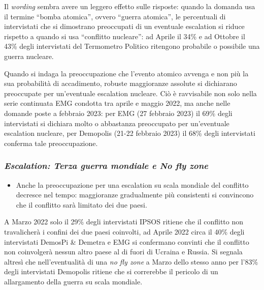 \documentclass[
  openany]{book}
\providecommand{\tightlist}{%
  \setlength{\itemsep}{0pt}\setlength{\parskip}{0pt}}
\begin{document}
Il \emph{wording} sembra avere un leggero effetto sulle risposte: quando la domanda usa il termine ``bomba atomica'', ovvero ``guerra atomica'', le percentuali di intervistati che si dimostrano preoccupati di un eventuale escalation si riduce rispetto a quando si usa ``conflitto nucleare'': ad Aprile il 34\% e ad Ottobre il 43\% degli intervistati del Termometro Politico ritengono probabile o possibile una guerra nucleare.

Quando si indaga la preoccupazione che l'evento atomico avvenga e non più la sua probabilità di accadimento, robuste maggioranze assolute si dichiarano preoccupate per un'eventuale escalation nucleare. Ciò è ravvisabile non solo nella serie continuata EMG condotta tra aprile e maggio 2022, ma anche nelle domande poste a febbraio 2023: per EMG (27 febbraio 2023) il 69\% degli intervistati si dichiara molto o abbastanza preoccupato per un'eventuale escalation nucleare, per Demopolis (21-22 febbraio 2023) il 68\% degli intervistati conferma tale preoccupazione.

\hypertarget{escalation-terza-guerra-mondiale-e-no-fly-zone}{%
\subsubsection{\texorpdfstring{\emph{Escalation: Terza guerra mondiale e No fly zone}}{Escalation: Terza guerra mondiale e No fly zone}}\label{escalation-terza-guerra-mondiale-e-no-fly-zone}}

\begin{itemize}
\tightlist
\item
  Anche la preoccupazione per una escalation su scala mondiale del conflitto decresce nel tempo: maggioranze gradualmente più consistenti si convincono che il conflitto sarà limitato dei due paesi.
\end{itemize}

A Marzo 2022 solo il 29\% degli intervistati IPSOS ritiene che il conflitto non travalicherà i confini dei due paesi coinvolti, ad Aprile 2022 circa il 40\% degli intervistati DemosPi \& Demetra e EMG si confermano convinti che il conflitto non coinvolgerà nessun altro paese al di fuori di Ucraina e Russia. Si segnala altresì che nell'eventualità di una \emph{no fly zone} a Marzo dello stesso anno per l'83\% degli intervistati Demopolis ritiene che si correrebbe il pericolo di un allargamento della guerra su scala mondiale.
\end{document}
